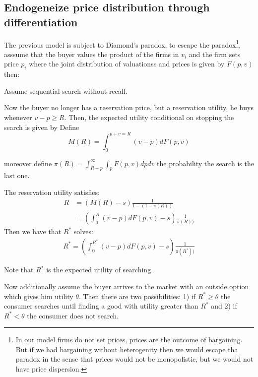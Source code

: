 \documentclass[12pt]{article}
\theoremstyle{plain}
\theoremstyle{plain}
\begin{document}




\subsection{Endogeneize price distribution through differentiation}

The previous model is subject to Diamond's paradox, to escape the paradox\footnote{In our model firms do not set prices, prices are the outcome of bargaining. But if we had bargaining without heterogenity then we would escape tha paradox in the sense that prices would not be monopolistic, but we would not have price dispersion. }, asssume that the buyer values the product of the firms in $v_i$ and the firm sets price $p_i$ where the joint distribution of valuationss and prices is given by $F(p,v)$ then: 

Assume sequential search without recall. 

Now the buyer no longer has a reservation price, but a reservation utility, he buys whenever $v-p\geq R$. Then, the expected utility conditional on stopping the search is given by 
Define
$$M(R) = \int_0^{p+v=R} (v-p)dF(p,v)$$ 

moreover define $\pi(R) = \int_{R-p}^\infty \int_p F(p,v)dpdv$ the probability the search is the last one. 

The reservation utility satisfies: 
\begin{align*}
        R &= (M(R)-s)\frac{1}{1-(1-\pi(R))} \\
        &= \left( \int_0^R (v-p)dF(p,v)-s\right)\frac{1}{\pi(R))} 
\end{align*}
Then we have that $R^*$ solves: 
\begin{align}\label{eq:reservation_utility}
        R^* = \left( \int_0^{R^*} (v-p)dF(p,v)-s\right)\frac{1}{\pi(R^*))} 
\end{align}


Note that $R^*$ is the expected utility of searching. 

Now additionally assume the buyer arrives to the market with an outside option which gives him utility $\theta$. Then there are two possibilities: 1) if $ R^*\geq \theta $ the consumer searches until finding a good with utility greater than  $R^*$ and 2) if $R^*<\theta$ the consumer does not search.
\end{document}
